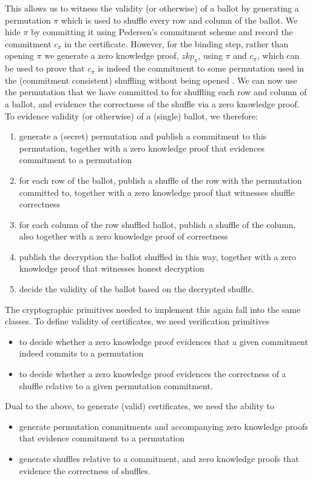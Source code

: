 \noindent
This allows us to witness the validity (or otherwise) of a ballot by generating a 
permutation $\pi$ which is used to shuffle every row and column of the ballot.
We hide $\pi$ by committing it using Pedersen's 
commitment scheme 
and record the commitment $c_{\pi}$ in the certificate. However, for the binding step, rather 
than opening $\pi$ we generate a zero knowledge proof, $zkp_{\pi}$, 
using $\pi$ and $c_{\pi}$, which can 
be  used to prove that $c_{\pi}$ is indeed the commitment to some permutation
used in the (commitment consistent) shuffling 
 without being opened \citep{Wikstrom:2009:CPS}. We can now use the
 permutation that we have committed to for 
shuffling each row and column of a ballot, and evidence the
correctness of the shuffle via a zero knowledge proof.
%
To evidence validity (or otherwise) of a (single) ballot, we
therefore:
\begin{enumerate}
  \item generate a (secret) permutation and publish a commitment to this
  permutation, together with a zero knowledge proof that evidences commitment
  to a permutation
  \item for each row of the ballot, publish a shuffle of the row with
  the permutation committed to, together with a zero knowledge proof
  that witnesses shuffle correctness
  \item for each column of the row shuffled ballot, publish a
  shuffle of the column, also together with a zero knowledge proof of
  correctness 
  \item publish the decryption the ballot shuffled in this way, together with a
  zero knowledge proof that witnesses honest decryption
  \item decide the validity of the ballot based on the decrypted
  shuffle.
\end{enumerate}

\noindent
The cryptographic primitives needed to implement this again fall
into the same classes. To define validity of certificates, we need
verification primitives
\begin{itemize}
  \item to decide whether a zero knowledge proof evidences that a
  given commitment indeed commits to a permutation 
  \item to decide whether a zero knowledge proof evidences the
  correctness of a shuffle relative to a given permutation
  commitment.
\end{itemize}

\noindent
Dual to the above, to generate (valid) certificates, we need the
ability to
\begin{itemize}
  \item generate permutation commitments and accompanying zero
  knowledge proofs that evidence commitment to a permutation
  \item generate shuffles relative to a commitment, and zero
  knowledge proofs that evidence the correctness of shuffles.
\end{itemize}


